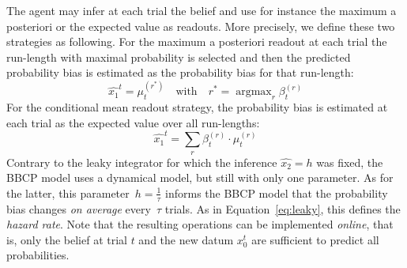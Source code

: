 \documentclass[12pt,english]{article}%
\newcommand{\eql}[1]{\begin{equation}#1\end{equation}}
\DeclareMathOperator{\argmax}{argmax}
\newcommand{\seeEq}[1]{Equation~\ref{eq:#1}}
\begin{document}
The agent may infer at each trial the belief
and use for instance the maximum a posteriori or the expected value as readouts.
More precisely, we define these two strategies as following.
For the maximum a posteriori readout
at each trial the run-length with maximal probability is selected
and then the predicted probability bias is estimated
as the probability bias for that run-length:
\eql{
\hat{x_1}^t = \mu^{(r^\ast)}_{t} \quad \text{with} \quad r^\ast = \argmax_r \beta^{(r)}_{t}
}
For the conditional mean readout strategy, the probability bias is estimated
at each trial as the expected value over all run-lengths:
\eql{
\hat{x_1}^t = \sum_{r} \beta^{(r)}_{t} \cdot \mu^{(r)}_{t}
}
Contrary to the leaky integrator for which the inference $\hat{x_2}=h$ was fixed,
the BBCP model uses a dynamical model, but still with only one parameter.
As for the latter, this parameter~$h=\frac 1 \tau$ informs the BBCP model
that the probability bias  changes \emph{on average} every~$\tau$ trials.
As in \seeEq{leaky}, this defines the \emph{hazard rate}.
Note that the resulting operations can be implemented \textit{online}, that is,
only the belief at trial $t$ and the new datum $x_0^t$
are sufficient to predict all probabilities.
\end{document}
